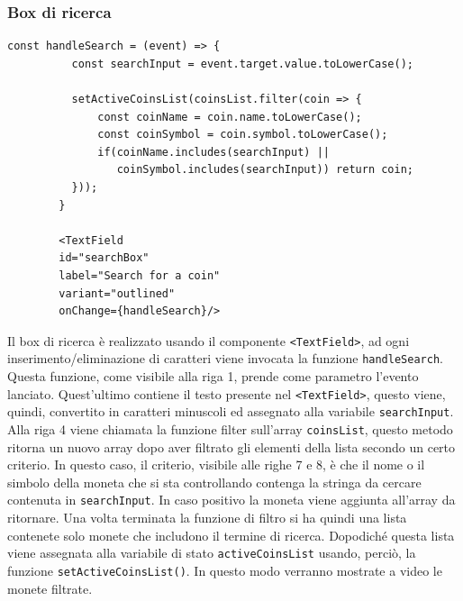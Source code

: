 \documentclass[a4paper]{article}
\begin{document}
        \subsubsection{Box di ricerca}
        \begin{lstlisting}[style=ES6, title={Funzione fetchCoins}]
        const handleSearch = (event) => {
          const searchInput = event.target.value.toLowerCase();
  
          setActiveCoinsList(coinsList.filter(coin => {
              const coinName = coin.name.toLowerCase();
              const coinSymbol = coin.symbol.toLowerCase();
              if(coinName.includes(searchInput) || 
                 coinSymbol.includes(searchInput)) return coin;
          }));
        }

        <TextField 
        id="searchBox"
        label="Search for a coin"
        variant="outlined"
        onChange={handleSearch}/> \end{lstlisting}
        Il box di ricerca è realizzato usando il componente \verb|<TextField>|, ad ogni inserimento/eliminazione di caratteri viene invocata la funzione \verb|handleSearch|.
        Questa funzione, come visibile alla riga 1, prende come parametro l'evento lanciato. Quest'ultimo contiene il testo presente nel \verb|<TextField>|,
        questo viene, quindi, convertito in caratteri minuscoli ed assegnato alla variabile \verb|searchInput|. Alla riga 4 viene chiamata la funzione filter sull'array \verb|coinsList|,
        questo metodo ritorna un nuovo array dopo aver filtrato gli elementi della lista secondo un certo criterio. In questo caso, il criterio, visibile alle righe 7 e 8,
        è che il nome o il simbolo della moneta che si sta controllando contenga la stringa da cercare contenuta in \verb|searchInput|. In caso positivo la moneta viene aggiunta all'array da ritornare.
        Una volta terminata la funzione di filtro si ha quindi una lista contenete solo monete che includono il termine di ricerca. Dopodiché questa lista viene assegnata alla variabile di stato \verb|activeCoinsList| usando,
        perciò, la funzione \verb|setActiveCoinsList()|. In questo modo verranno mostrate a video le monete filtrate. 
\end{document}
